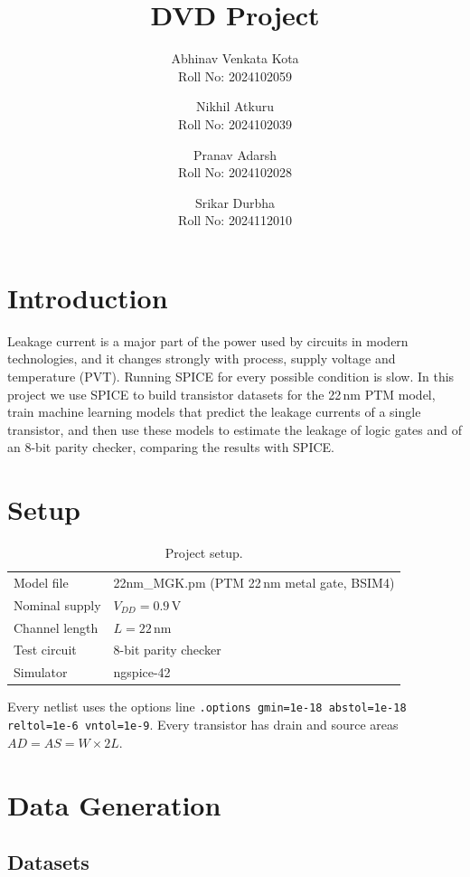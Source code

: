 \documentclass{article}
\title{DVD Project}
\author
{
    Abhinav Venkata Kota \\ Roll No: 2024102059
    \and
    Nikhil Atkuru \\ Roll No: 2024102039
    \and
    Pranav Adarsh \\ Roll No: 2024102028
    \and
    Srikar Durbha \\ Roll No: 2024112010
}
\date{}
\begin{document}
\maketitle

\section{Introduction}

Leakage current is a major part of the power used by circuits in modern
technologies, and it changes strongly with process, supply voltage and
temperature (PVT). Running SPICE for every possible condition is slow. In
this project we use SPICE to build transistor datasets for the 22\,nm PTM
model, train machine learning models that predict the leakage currents of a
single transistor, and then use these models to estimate the leakage of
logic gates and of an 8-bit parity checker, comparing the results with SPICE.

\section{Setup}

\begin{table}[htbp]
\centering
\begin{tabular}{|l|l|}
\hline
Model file & 22nm\_MGK.pm (PTM 22\,nm metal gate, BSIM4) \\
Nominal supply & $V_{DD} = 0.9$\,V \\
Channel length & $L = 22$\,nm \\
Test circuit & 8-bit parity checker \\
Simulator & ngspice-42 \\

\hline
\end{tabular}
\caption{Project setup.}
\end{table}

Every netlist uses the options line
\texttt{.options gmin=1e-18 abstol=1e-18 reltol=1e-6 vntol=1e-9}.
Every transistor has drain and source areas $AD = AS = W \times 2L$.

\section{Data Generation}

\subsection{Datasets}
\end{document}
